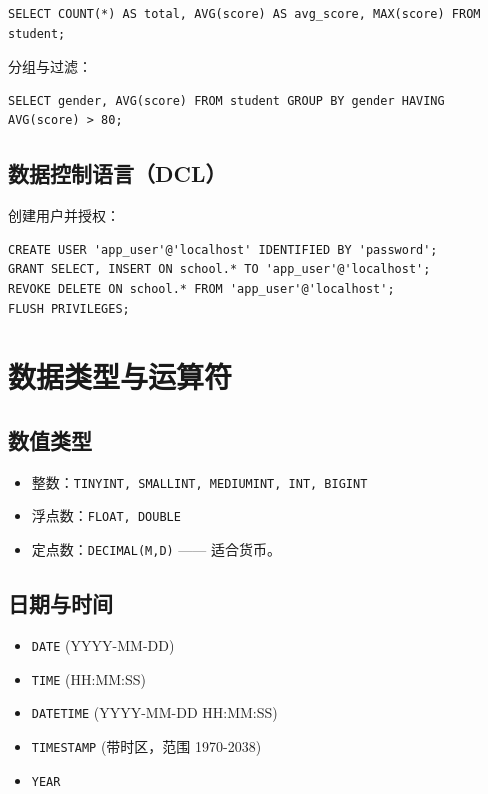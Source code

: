 \documentclass[12pt,UTF8]{ctexbook}
\begin{document}
\begin{lstlisting}
SELECT COUNT(*) AS total, AVG(score) AS avg_score, MAX(score) FROM student;
\end{lstlisting}

分组与过滤：

\begin{lstlisting}
SELECT gender, AVG(score) FROM student GROUP BY gender HAVING AVG(score) > 80;
\end{lstlisting}

\section{数据控制语言（DCL）}
创建用户并授权：
\begin{lstlisting}
CREATE USER 'app_user'@'localhost' IDENTIFIED BY 'password';
GRANT SELECT, INSERT ON school.* TO 'app_user'@'localhost';
REVOKE DELETE ON school.* FROM 'app_user'@'localhost';
FLUSH PRIVILEGES;
\end{lstlisting}

\chapter{数据类型与运算符}
\label{ch:datatypes}

\section{数值类型}

\begin{itemize}
  \item 整数：\texttt{TINYINT, SMALLINT, MEDIUMINT, INT, BIGINT}
  \item 浮点数：\texttt{FLOAT, DOUBLE}
  \item 定点数：\texttt{DECIMAL(M,D)} —— 适合货币。
\end{itemize}

\section{日期与时间}

\begin{itemize}
  \item \texttt{DATE} (YYYY-MM-DD)
  \item \texttt{TIME} (HH:MM:SS)
  \item \texttt{DATETIME} (YYYY-MM-DD HH:MM:SS)
  \item \texttt{TIMESTAMP} (带时区，范围 1970-2038)
  \item \texttt{YEAR}
\end{itemize}
\end{document}
